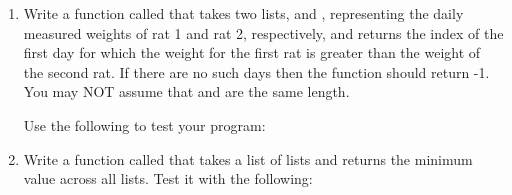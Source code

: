 \documentclass[letterpaper,10pt,english]{sphinxmanual}
\begin{document}
\begin{enumerate}
\item {} 
Write a function called  that takes two lists,
 and ,
representing the daily measured weights of rat 1 and rat 2,
respectively, and returns the index of the first day for which the
weight for the first rat is greater than the weight of the second
rat.  If there are no such days then the function should return
-1.  You may NOT assume that  and  are the same length.

Use the following to test your program:

\begin{sphinxVerbatim}[commandchars=\\\{\}]
   
      \PYG{p}{[}   \PYG{p}{]}
      \PYG{p}{[}   \PYG{p}{]}
     
      \PYG{p}{[}    \PYG{p}{]}
     
      \PYG{p}{[}  \PYG{p}{]}
     
\end{sphinxVerbatim}

\item {} 
Write a function called  that takes a list of lists and
returns the minimum value across all lists. Test it with the
following:


\end{enumerate}
\end{document}
